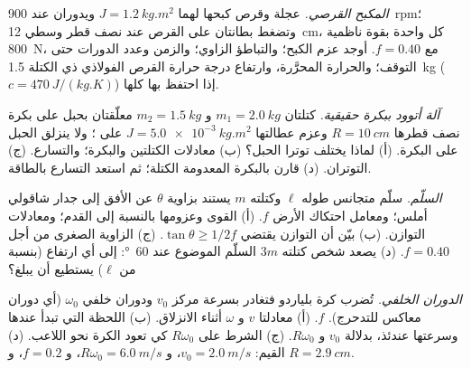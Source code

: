 \begin{exercise}[$\star\star$]\label{exo:b2:rigid-body-mechanics:6}
\emph{المكبح القرصي.} عجلة وقرص كبحها لهما $J = \qty{1.2}{kg.m^2}$
ويدوران عند \qty{900}{rpm}؛ وتضغط بطانتان على القرص عند نصف قطر
وسطي \qty{12}{cm}، كل واحدة بقوة ناظمية \qty{800}{N}، مع $f = 0.40$.
أوجد عزم الكبح؛ والتباطؤ الزاوي؛ والزمن وعدد الدورات حتى
التوقف؛ والحرارة المحرَّرة، وارتفاع درجة حرارة القرص الفولاذي
ذي الكتلة \qty{1.5}{kg} ($c = \qty{470}{J/(kg.K)}$) إذا احتفظ بها كلها.
\end{exercise}

\begin{exercise}[$\star\star$]\label{exo:b2:rigid-body-mechanics:7}
\emph{آلة أتوود ببكرة حقيقية.} كتلتان $m_1 = \qty{2.0}{kg}$
و $m_2 = \qty{1.5}{kg}$ معلّقتان بحبل على بكرة نصف قطرها $R =
\qty{10}{cm}$ وعزم عطالتها $J = \qty{5.0e-3}{kg.m^2}$ على ؛ ولا ينزلق الحبل على البكرة. (أ) لماذا يختلف توترا
الحبل؟ (ب) معادلات الكتلتين والبكرة؛ والتسارع. (ج) التوتران.
(د) قارن بالبكرة المعدومة الكتلة؛ ثم استعد التسارع بالطاقة.
\end{exercise}

\begin{exercise}[$\star\star$]\label{exo:b2:rigid-body-mechanics:8}
\emph{السلّم.} سلّم متجانس طوله $\ell$ وكتلته $m$ يستند بزاوية
$\theta$ عن الأفق إلى جدار شاقولي أملس؛ ومعامل احتكاك الأرض $f$.
(أ) القوى وعزومها بالنسبة إلى القدم؛ ومعادلات التوازن. (ب) بيّن
أن التوازن يقتضي $\tan\theta \ge 1/2f$. (ج) الزاوية الصغرى من أجل
$f = 0.40$. (د) يصعد شخص كتلته $3m$ السلّم الموضوع عند
\qty{60}{\degree}: إلى أي ارتفاع (بنسبة من $\ell$) يستطيع أن يبلغ؟
\end{exercise}

\begin{exercise}[$\star\star$]\label{exo:b2:rigid-body-mechanics:9}
\emph{الدوران الخلفي.} تُضرب كرة بلياردو فتغادر بسرعة مركز
$v_0$ ودوران خلفي $\omega_0$ (أي دوران معاكس للتدحرج).  $f$. (أ) معادلتا $v$ و $\omega$ أثناء الانزلاق. (ب) اللحظة
التي تبدأ عندها  وسرعتها عندئذ، بدلالة
$v_0$ و $R\omega_0$. (ج) الشرط على
$R\omega_0$ كي تعود الكرة نحو اللاعب. (د) القيم:
$v_0 = \qty{2.0}{m/s}$، و $R\omega_0 = \qty{6.0}{m/s}$، و $f = 0.2$،
و $R = \qty{2.9}{cm}$.
\end{exercise}

